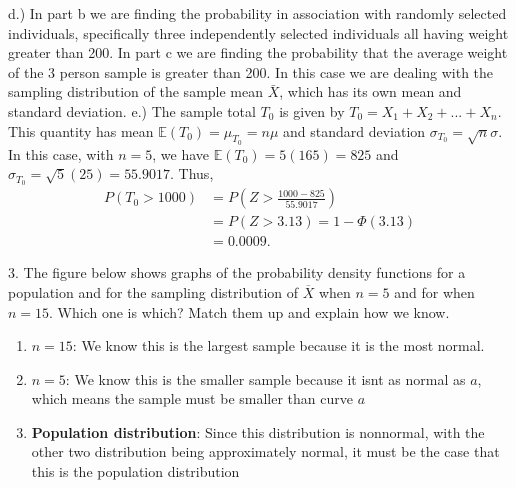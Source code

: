 \documentclass{report}
\begin{document}
\bigbreak \noindent 
d.) In part b we are finding the probability in association with randomly selected individuals, specifically three independently selected individuals all having weight greater than 200. 
\bigbreak \noindent 
In part c we are finding the probability that the average weight of the 3 person sample is greater than 200.  In this case we are dealing with the sampling distribution of the sample mean $\bar{X}$, which has its own mean and standard deviation. 
\bigbreak \noindent 
e.) The sample total $T_{0}$ is given by $T_{0} = X_{1} + X_{2} + ... + X_{n}$. This quantity has mean $\mathbb{E}({T_{0}}) = \mu_{T_{0}} = n\mu$ and standard deviation $\sigma_{T_{0}} = \sqrt{n} \sigma$. In this case, with $n=5$, we have $\mathbb{E}(T_{0}) = 5(165) = 825$ and $\sigma_{T_{0}} = \sqrt{5}(25) = 55.9017$. Thus,
\begin{align*}
    P(T_{0} > 1000) &= P\left(Z > \frac{1000-825}{55.9017}\right) \\
    &=P(Z > 3.13) = 1-\Phi(3.13) \\
    &=0.0009
.\end{align*}


\pagebreak \bigbreak \noindent 
\begin{mdframed}
     3. The figure below shows graphs of the probability density functions for a population and for the sampling distribution of \( \overline{X} \) when \( n = 5 \) and for when \( n = 15 \). Which one is which? Match them up and explain how we know.
    \begin{center}
    \end{center}
\end{mdframed}
\bigbreak \noindent 
\begin{enumerate}[label=(\alph*)]
    \item $n=15$: We know this is the largest sample because it is the most normal. 
    \item  $n=5$: We know this is the smaller sample because it isnt as normal as $a$, which means the sample must be smaller than curve $a$
    \item  \textbf{Population distribution}: Since this distribution is nonnormal, with the other two distribution being approximately normal, it must be the case that this is the population distribution
\end{enumerate}
\end{document}
